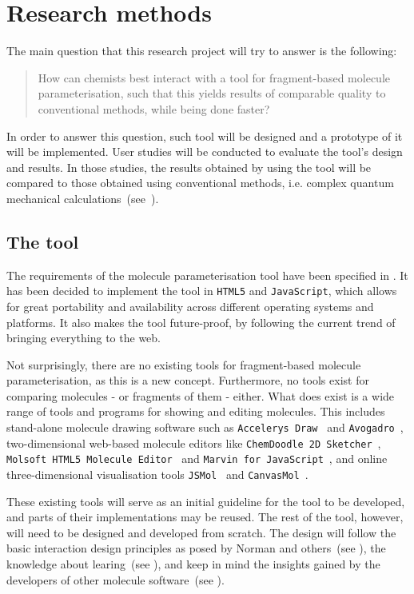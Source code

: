 \chapter{Research methods}

The main question that this research project will try to answer is the following:
\begin{quote}
How can chemists best interact with a tool for fragment-based molecule parameterisation, such that this yields results of comparable quality to conventional methods, while being done faster?
\end{quote}
In order to answer this question, such tool will be designed and a prototype of it will be implemented. User studies will be conducted to evaluate the tool's design and results. In those studies, the results obtained by using the tool will be compared to those obtained using conventional methods, i.e. complex quantum mechanical calculations~(see~).


\section{The tool}

The requirements of the molecule parameterisation tool have been specified in . It has been decided to implement the tool in \verb|HTML5| and \verb|JavaScript|, which allows for great portability and availability across different operating systems and platforms. It also makes the tool future-proof, by following the current trend of bringing everything to the web.

Not surprisingly, there are no existing tools for fragment-based molecule parameterisation, as this is a new concept. Furthermore, no tools exist for comparing molecules - or fragments of them - either. What does exist is a wide range of tools and programs for showing and editing molecules. This includes stand-alone molecule drawing software such as \verb|Accelerys Draw|~\cite{accelrys2012accelrys} and \verb|Avogadro|~\cite{hanwell2012avogadro}, two-dimensional web-based molecule editors like \verb|ChemDoodle 2D Sketcher|~\cite{ichemlabs2013chemdoodle}, \verb|Molsoft HTML5 Molecule Editor|~\cite{molsoft2012molsoft} and \verb|Marvin for JavaScript|~\cite{chemxon2013marvin}, and online three-dimensional visualisation tools \verb|JSMol|~\cite{hanson2013jsmol} and \verb|CanvasMol|~\cite{altered2013canvasmol}.

These existing tools will serve as an initial guideline for the tool to be developed, and parts of their implementations may be reused. The rest of the tool, however, will need to be designed and developed from scratch. The design will follow the basic interaction design principles as posed by Norman and others~(see ), the knowledge about learing~(see ), and keep in mind the insights gained by the developers of other molecule software~(see ).

